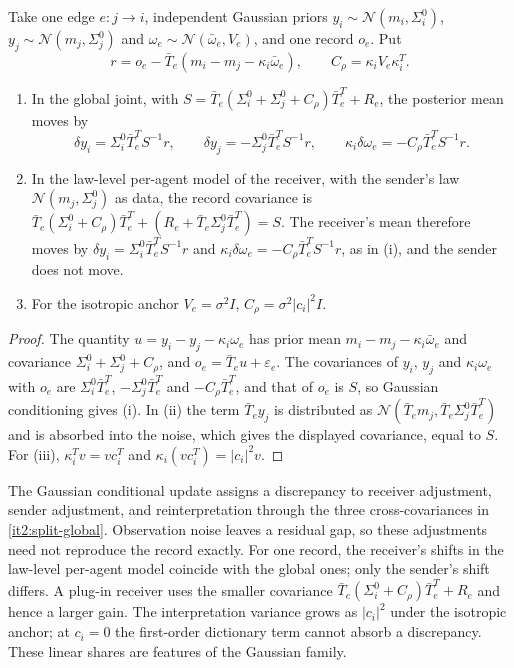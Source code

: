 \documentclass[11pt,letterpaper]{report}
\begin{document}
Take one edge $e:j\to i$, independent Gaussian priors $y_i\sim\mathcal N(m_i,\Sigma_i^0)$, $y_j\sim\mathcal N(m_j,\Sigma_j^0)$ and $\omega_e\sim\mathcal N(\bar\omega_e,V_e)$, and one record $o_e$. Put
\begin{equation}
r=o_e-\bar T_e(m_i-m_j-\kappa_i\bar\omega_e),\qquad C_\rho=\kappa_iV_e\kappa_i^T.
\label{it2:split-notation}
\end{equation}
\begin{enumerate}
\item[(i)] In the global joint, with $S=\bar T_e(\Sigma_i^0+\Sigma_j^0+C_\rho)\bar T_e^T+R_e$, the posterior mean moves by
\begin{equation}
\delta y_i=\Sigma_i^0\bar T_e^TS^{-1}r,\qquad
\delta y_j=-\Sigma_j^0\bar T_e^TS^{-1}r,\qquad
\kappa_i\delta\omega_e=-C_\rho\bar T_e^TS^{-1}r.
\label{it2:split-global}
\end{equation}
\item[(ii)] In the law-level per-agent model of the receiver, with the sender's law $\mathcal N(m_j,\Sigma_j^0)$ as data, the record covariance is $\bar T_e(\Sigma_i^0+C_\rho)\bar T_e^T+(R_e+\bar T_e\Sigma_j^0\bar T_e^T)=S$. The receiver's mean therefore moves by $\delta y_i=\Sigma_i^0\bar T_e^TS^{-1}r$ and $\kappa_i\delta\omega_e=-C_\rho\bar T_e^TS^{-1}r$, as in (i), and the sender does not move.
\item[(iii)] For the isotropic anchor $V_e=\sigma^2I$, $C_\rho=\sigma^2\vert c_i\vert^2I$.
\end{enumerate}
\begin{proof}
The quantity $u=y_i-y_j-\kappa_i\omega_e$ has prior mean $m_i-m_j-\kappa_i\bar\omega_e$ and covariance $\Sigma_i^0+\Sigma_j^0+C_\rho$, and $o_e=\bar T_eu+\varepsilon_e$. The covariances of $y_i$, $y_j$ and $\kappa_i\omega_e$ with $o_e$ are $\Sigma_i^0\bar T_e^T$, $-\Sigma_j^0\bar T_e^T$ and $-C_\rho\bar T_e^T$, and that of $o_e$ is $S$, so Gaussian conditioning gives (i). In (ii) the term $\bar T_ey_j$ is distributed as $\mathcal N(\bar T_em_j,\bar T_e\Sigma_j^0\bar T_e^T)$ and is absorbed into the noise, which gives the displayed covariance, equal to $S$. For (iii), $\kappa_i^Tv=vc_i^T$ and $\kappa_i(vc_i^T)=\vert c_i\vert^2v$.
\end{proof}

The Gaussian conditional update assigns a discrepancy to receiver adjustment, sender adjustment, and reinterpretation through the three cross-covariances in \cref{it2:split-global}. Observation noise leaves a residual gap, so these adjustments need not reproduce the record exactly. For one record, the receiver's shifts in the law-level per-agent model coincide with the global ones; only the sender's shift differs. A plug-in receiver uses the smaller covariance $\bar T_e(\Sigma_i^0+C_\rho)\bar T_e^T+R_e$ and hence a larger gain. The interpretation variance grows as $|c_i|^2$ under the isotropic anchor; at $c_i=0$ the first-order dictionary term cannot absorb a discrepancy. These linear shares are features of the Gaussian family.
\end{document}
